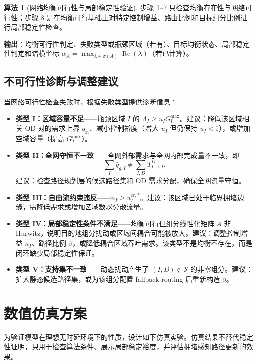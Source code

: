 \documentclass[a4paper,12pt]{article}
\theoremstyle{plain}
\theoremstyle{definition}
\newtheorem{algorithm}[theorem]{算法}
\theoremstyle{remark}
\begin{document}
\begin{algorithm}[网络均衡可行性与局部稳定性验证]
步骤 1--7 只检查均衡存在性与网络可行性；步骤 8 是在均衡可行基础上对特定控制增益、路由比例和目标组分比例进行局部稳定性检查。

\textbf{输出}：均衡可行性判定、失败类型或瓶颈区域（若有）、目标均衡状态、局部稳定性判定和谱横坐标 $\alpha_A=\max_{\lambda\in\sigma(A)}\operatorname{Re}(\lambda)$（若已计算）。
\end{algorithm}

\subsection{不可行性诊断与调整建议}

当网络可行性检查失败时，根据失败类型提供诊断信息：
\begin{itemize}
    \item \textbf{类型 I：区域容量不足}——瓶颈区域 $I$ 的 $\Lambda_I \ge \bar u_I G_I^{\max}$。建议：降低该区域相关 OD 对的需求上界 $\bar{q}_m$、减小控制裕度（增大 $\bar u_I$ 但仍保持 $\bar u_I<1$），或增加空域容量（提高 $G_I^{\max}$）。
    \item \textbf{类型 II：全网守恒不一致}——全网外部需求与全网内部完成量不一致，即
    \begin{equation}
        \sum_I \bar{q}_{g,I} \ne \sum_{I,D} T_{I \to I}^D .
    \end{equation}
    建议：检查路径规划层的候选路径集和 OD 需求分配，确保全网流量守恒。
    \item \textbf{类型 III：自由流约束违反}——$\bar{n}_I \ge n_I^{cr,*}$。建议：该区域已处于临界拥堵边缘，需降低需求或增加区域数以分散流量。
    \item \textbf{类型 IV：局部稳定性条件不满足}——均衡可行但组分线性化矩阵 $A$ 非 Hurwitz，说明目的地组分扰动或区域间耦合可能被放大。建议：调整控制增益 $\kappa_I$、路径比例 $\beta$，或降低耦合区域吞吐需求。该类型不是均衡不存在，而是闭环缺少局部稳定性保证。
    \item \textbf{类型 V：支持集不一致}——动态扰动产生了 $(I,D)\notin\mathcal S$ 的非零组分。建议：扩大静态候选路径集，或为该组分配置 fallback routing 后重新构造 $\beta$。
\end{itemize}

\section{数值仿真方案}

为验证模型在理想无时延环境下的性质，设计如下仿真实验。仿真结果不替代稳定性证明，只用于检查算法条件、展示局部稳定裕度，并评估拥堵感知路径更新的效果。
\end{document}
